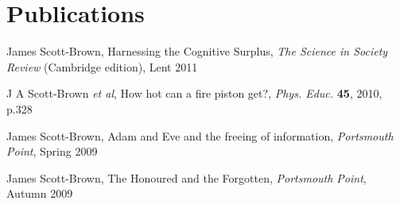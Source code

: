 \documentclass[letterpaper]{article}
\renewenvironment{itemize}{
  \begin{list}{}{
    \setlength{\leftmargin}{1.5em}
  }
}{
  \end{list}
}
\begin{document}
\section*{Publications}
\begin{itemize}
\item James Scott-Brown, Harnessing the Cognitive Surplus, \textit{The Science in Society Review} (Cambridge edition), Lent 2011
\item J A Scott-Brown \textit{et al}, How hot can a fire piston get?, \textit{Phys. Educ.} {\bf 45}, 2010, p.328
\item James Scott-Brown, Adam and Eve and the freeing of information, \textit{Portsmouth Point}, Spring 2009
\item James Scott-Brown, The Honoured and the Forgotten, \textit{Portsmouth Point}, Autumn 2009
\end{itemize}

\end{document}
